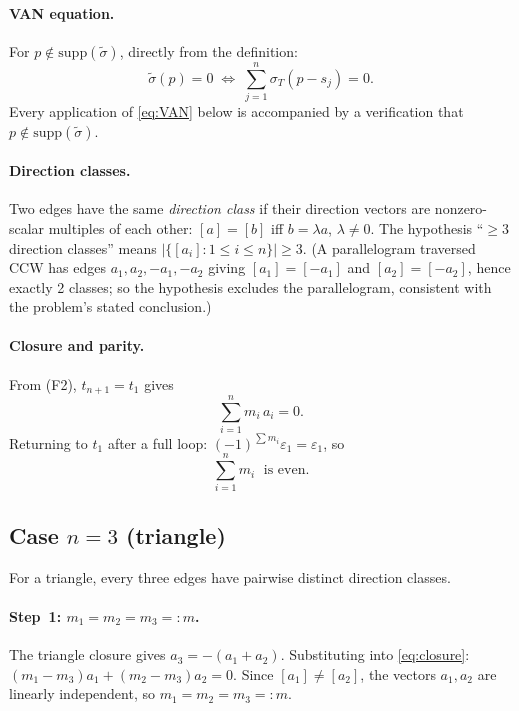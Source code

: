\paragraph{VAN equation.}
For $p\notin\mathrm{supp}(\tilde\sigma)$, directly from the definition:
\begin{equation}\label{eq:VAN}
  \tilde\sigma(p) = 0 \;\Longleftrightarrow\; \sum_{j=1}^n \sigma_T(p-s_j)=0.
  \tag{VAN}
\end{equation}
Every application of \eqref{eq:VAN} below is accompanied by a verification
that $p\notin\mathrm{supp}(\tilde\sigma)$.

\paragraph{Direction classes.}
Two edges have the same \emph{direction class} if their direction vectors
are nonzero-scalar multiples of each other: $[a]=[b]$ iff $b=\lambda a$,
$\lambda\ne 0$.
The hypothesis ``$\ge 3$ direction classes'' means $|\{[a_i]:1\le i\le n\}|\ge 3$.
(A parallelogram traversed CCW has edges $a_1,a_2,-a_1,-a_2$ giving
$[a_1]=[-a_1]$ and $[a_2]=[-a_2]$, hence exactly 2 classes; so
the hypothesis excludes the parallelogram, consistent with the problem's
stated conclusion.)

\paragraph{Closure and parity.}
From (F2), $t_{n+1}=t_1$ gives
\begin{equation}\label{eq:closure}\textstyle
  \sum_{i=1}^n m_i\,a_i = 0. \tag{Cl}
\end{equation}
Returning to $t_1$ after a full loop: $(-1)^{\sum m_i}\varepsilon_1=\varepsilon_1$, so
\begin{equation}\label{eq:parity}
  \sum_{i=1}^n m_i \;\text{ is even.}\tag{Par}
\end{equation}

\subsection*{Case $n=3$ (triangle)}

For a triangle, every three edges have pairwise distinct direction classes.

\paragraph{Step~1: $m_1=m_2=m_3=:m$.}
The triangle closure gives $a_3=-(a_1+a_2)$.  Substituting into
\eqref{eq:closure}:
$(m_1-m_3)a_1+(m_2-m_3)a_2=0$.
Since $[a_1]\ne[a_2]$, the vectors $a_1,a_2$ are linearly independent,
so $m_1=m_2=m_3=:m$.

